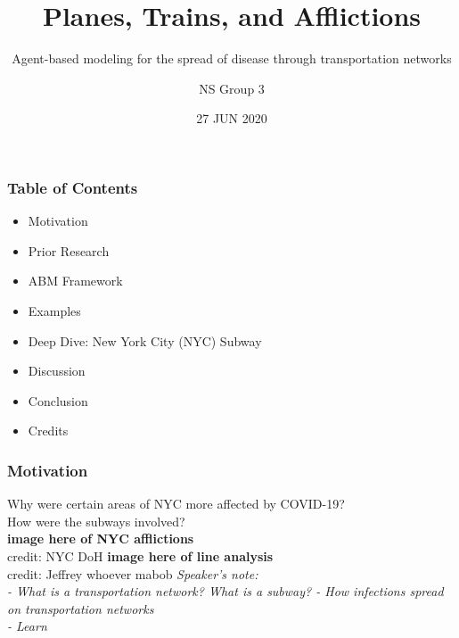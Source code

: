 \documentclass{beamer}
\begin{document}
\title{Planes, Trains, and Afflictions}
\subtitle{Agent-based modeling for the spread of disease through transportation networks}
\author{NS Group 3}
\date{27 JUN 2020}
\begin{frame}
\titlepage
\end{frame}
\begin{frame}
\frametitle{Table of Contents}
\begin{itemize}
    \item Motivation
    \item Prior Research
    \item ABM Framework
    \item Examples
    \item Deep Dive: New York City (NYC) Subway
    \item Discussion
    \item Conclusion
    \item Credits
\end{itemize}
\end{frame}
\begin{frame}
\frametitle{Motivation}
Why were certain areas of NYC more affected by COVID-19?\\
How were the subways involved?\\
\textbf{image here of NYC afflictions}\\
credit: NYC DoH
\textbf{image here of line analysis}\\
credit: Jeffrey whoever mabob
\textit{Speaker's note:\\
- What is a transportation network? What is a subway?
- How infections spread on transportation networks\\
- Learn
}
\end{frame}
\end{document}
